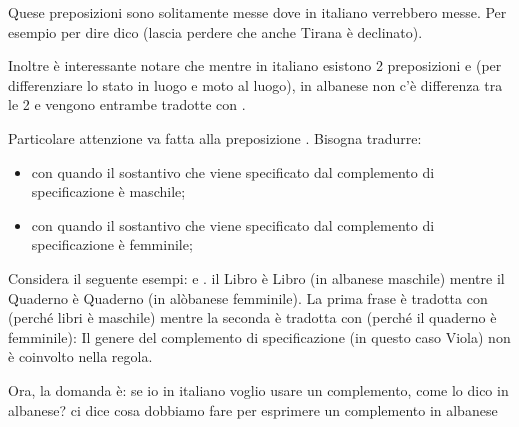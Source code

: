 Quese preposizioni sono solitamente messe dove in italiano verrebbero messe. Per esempio per dire  dico  (lascia perdere che anche Tirana è declinato).

Inoltre è interessante notare che mentre in italiano esistono 2 preposizioni  e  (per differenziare lo stato in luogo e moto al luogo), in albanese non c'è differenza tra le 2 e vengono entrambe tradotte con .

Particolare attenzione va fatta alla preposizione . Bisogna tradurre:

\begin{itemize}
    \item {} con  quando il sostantivo che viene specificato dal complemento di specificazione è maschile;
    \item {} con  quando il sostantivo che viene specificato dal complemento di specificazione è femminile;
\end{itemize}

Considera il seguente esempi:  e . il Libro è \glsdesc{Libro} (in albanese maschile) mentre il Quaderno è \glsdesc{Quaderno} (in alòbanese femminile). La prima frase è tradotta con  (perché libri è maschile) mentre la seconda è tradotta con  (perché il quaderno è femminile): Il genere del complemento di specificazione (in questo caso Viola) non è coinvolto nella regola.

Ora, la domanda è: se io in italiano voglio usare un complemento, come lo dico in albanese?  ci dice cosa dobbiamo fare per esprimere un complemento in albanese



